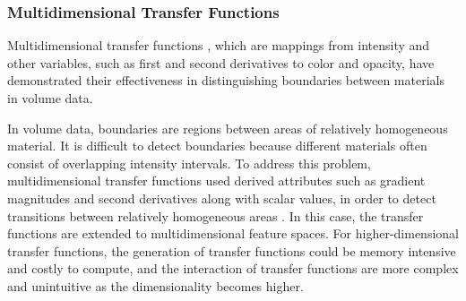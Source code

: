 \subsubsection{Multidimensional Transfer Functions \label{Multidimensional_Transfer_Functions}}
Multidimensional transfer functions \cite{kniss_interactive_2001}, which are mappings from intensity and other variables, such as first and second derivatives to color and opacity, have demonstrated their effectiveness in distinguishing boundaries between materials in volume data.


In volume data, boundaries are regions between areas of relatively homogeneous material. It is difficult to detect boundaries because different materials often consist of overlapping intensity intervals. To address this problem, multidimensional transfer functions used derived attributes such as gradient magnitudes and second derivatives along with scalar values, in order to detect transitions between relatively homogeneous areas \cite{kindlmann_semi-automatic_1998} \cite{kindlmann_transfer_2002}.
In this case, the transfer functions are extended to multidimensional feature spaces.
For higher-dimensional transfer functions, the generation of transfer functions could be memory intensive and costly to compute, and the interaction of transfer functions are more complex and unintuitive as the dimensionality becomes higher. 

